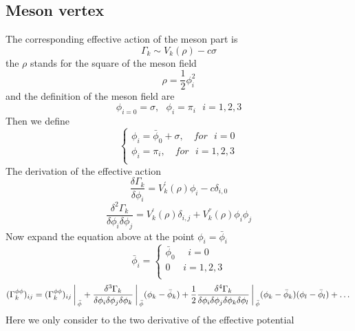 \documentclass[UTF8]{article}
\begin{document}
\subsection{Meson vertex}
The corresponding effective action of the meson part is
\begin{equation}
	\Gamma_k \sim V_k(\rho)-c\sigma
\end{equation}
the $\rho$ stands for the square of the meson field
\begin{equation}
	\rho=\frac{1}{2}\phi^2_i
\end{equation}
and the definition of the meson field are
\begin{equation}
	\phi_{i=0}=\sigma ,\,\,\,\,\phi_i=\pi_i\,\,\,\,i=1,2,3
\end{equation}
Then we define 
\begin{equation}
\begin{cases}
\phi_i=\bar{\phi}_0+\sigma,\quad for\,\,\,\, i=0\\
\phi_i=\pi_i,\quad for\,\,\,\, i=1,2,3\\
\end{cases}
\end{equation}
The derivation of the effective action 
\begin{equation}
	\frac{\delta \Gamma_k}{\delta \phi_i}=V^{'}_k(\rho)\phi_i-c\delta_{i,0}
\end{equation}
\begin{equation}
	\frac{\delta^2\Gamma_k}{\delta\phi_i\delta\phi_j}=V^{'}_k(\rho)\delta_{i,j}+V^{''}_k(\rho)\phi_i\phi_j
\end{equation}
Now expand the equation above at the point $\phi_i=\bar{\phi}_i$
\begin{equation}
\bar{\phi}_i=
	\begin{cases}
\bar{\phi}_0\,\,\,\,\,\,\,\, i=0\\
0\,\,\,\,\,\,\,\, i=1,2,3\\
\end{cases}
\end{equation}
\begin{equation}
	(\Gamma^{\phi\phi}_k)_{ij}=(\Gamma^{\phi\phi}_k)_{ij}\bigg\arrowvert_{\bar{\phi}}+\frac{\delta^3\Gamma_k}{\delta\phi_i\delta\phi_j\delta\phi_k}\bigg\arrowvert_{\bar{\phi}}(\phi_k-\bar{\phi}_k)+\frac{1}{2}\frac{\delta^4\Gamma_k}{\delta\phi_i\delta\phi_j\delta\phi_k\delta\phi_l}\bigg\arrowvert_{\bar{\phi}}(\phi_k-\bar{\phi}_k)(\phi_l-\bar{\phi}_l)+\dots
\end{equation}
Here we only consider to the two derivative of the effective potential
\end{document}
